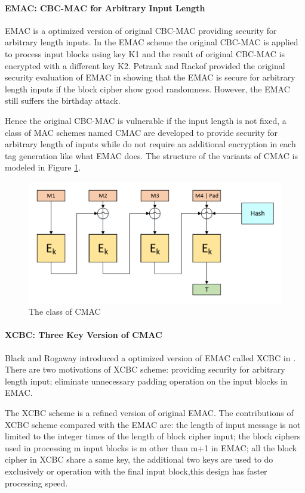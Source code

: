 \documentclass{article}
\begin{document}
\paragraph{EMAC: CBC-MAC for Arbitrary Input Length}
EMAC is a optimized version of original CBC-MAC providing security for arbitrary length inputs. In the EMAC scheme the original CBC-MAC is applied to process input blocks using key K1 and the result of original CBC-MAC is encrypted with a different key K2. 
Petrank and Rackof provided the original security evaluation of EMAC in \cite{emac} showing that the EMAC is secure for arbitrary length inputs if the block cipher show good randomness. However, the EMAC still suffers the birthday attack.

Hence the original CBC-MAC is vulnerable if the input length is not fixed, a class of MAC schemes named CMAC are developed to provide security for arbitrary length of inputs while do not require an additional encryption in each tag generation like what EMAC does. The structure of the variants of CMAC is modeled in Figure \ref{fig:CMAC}.
\begin{figure}[htbp]
\centering
\includegraphics[scale=0.5]{./diagrams/cmac.pdf}
\caption{The class of CMAC}
\label{fig:CMAC}
\end{figure}
\paragraph{XCBC: Three Key Version of CMAC}
Black and Rogaway introduced a optimized version of EMAC called XCBC in \cite{xcbc}.
There are two motivations of XCBC scheme: providing security for arbitrary length input; eliminate unnecessary padding operation on the input blocks in EMAC.

The XCBC scheme is a refined version of original EMAC. The contributions of XCBC scheme compared with the EMAC are: the length of input message is not limited to the integer times of the length of block cipher input; the block ciphers used in processing m input blocks is m other than m+1 in EMAC; all the block cipher in XCBC share a same key, the additional two keys are used to do exclusively or operation with the final input block,this design has faster processing speed.   
\end{document}
